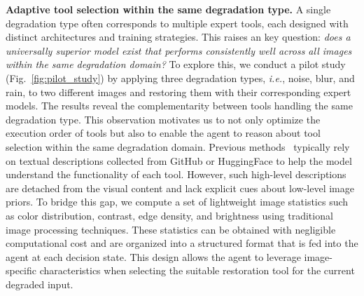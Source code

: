 \noindent\textbf{Adaptive tool selection within the same degradation type.}
A single degradation type often corresponds to multiple expert tools, each designed with distinct architectures and training strategies. This raises an key question: \textit{does a universally superior model exist that performs consistently well across all images within the same degradation domain?} To explore this, we conduct a pilot study (Fig.~\ref{fig:pilot_study}) by applying three degradation types, \textit{i.e.}, noise, blur, and rain, to two different images and restoring them with their corresponding expert models. The results reveal the complementarity between tools handling the same degradation type. This observation motivates us to not only optimize the execution order of tools but also to enable the agent to reason about tool selection within the same degradation domain. Previous methods~\cite{zhu2024intelligent,zuo20254kagent,chen2024restoreagent} typically rely on textual descriptions collected from GitHub or HuggingFace to help the model understand the functionality of each tool. However, such high-level descriptions are detached from the visual content and lack explicit cues about low-level image priors. To bridge this gap, we compute a set of lightweight image statistics such as color distribution, contrast, edge density, and brightness using traditional image processing techniques. These statistics can be obtained with negligible computational cost and are organized into a structured format that is fed into the agent at each decision state. This design allows the agent to leverage image-specific characteristics when selecting the suitable restoration tool for the current degraded input.

